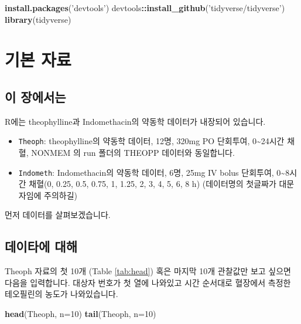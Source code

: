 \documentclass[12pt,]{krantz}
\newenvironment{Shaded}{\begin{snugshade}}{\end{snugshade}}
\newcommand{\KeywordTok}[1]{\textcolor[rgb]{0.13,0.29,0.53}{\textbf{#1}}}
\newcommand{\DataTypeTok}[1]{\textcolor[rgb]{0.13,0.29,0.53}{#1}}
\newcommand{\DecValTok}[1]{\textcolor[rgb]{0.00,0.00,0.81}{#1}}
\newcommand{\StringTok}[1]{\textcolor[rgb]{0.31,0.60,0.02}{#1}}
\newcommand{\OperatorTok}[1]{\textcolor[rgb]{0.81,0.36,0.00}{\textbf{#1}}}
\newcommand{\NormalTok}[1]{#1}
\providecommand{\tightlist}{%
  \setlength{\itemsep}{0pt}\setlength{\parskip}{0pt}}
\theoremstyle{definition}
\theoremstyle{definition}
\theoremstyle{definition}
\theoremstyle{remark}
\begin{document}
\begin{Shaded}
\begin{Highlighting}[]
\KeywordTok{install.packages}\NormalTok{(}\StringTok{'devtools'}\NormalTok{)}
\NormalTok{devtools}\OperatorTok{::}\KeywordTok{install_github}\NormalTok{(}\StringTok{'tidyverse/tidyverse'}\NormalTok{)}
\KeywordTok{library}\NormalTok{(tidyverse)}
\end{Highlighting}
\end{Shaded}

\chapter{기본 자료}\label{datasets}

\section{이 장에서는}\label{introdatasets}

R에는 theophylline과 Indomethacin의 약동학 데이터가 내장되어 있습니다.

\begin{itemize}
\tightlist
\item
  \texttt{Theoph}: theophylline의 약동학 데이터, 12명, 320mg PO
  단회투여, 0\textasciitilde{}24시간 채혈, NONMEM 의 run 폴더의 THEOPP
  데이터와 동일합니다.
\item
  \texttt{Indometh}: Indomethacin의 약동학 데이터, 6명, 25mg IV bolus
  단회투여, 0\textasciitilde{}8시간 채혈(0, 0.25, 0.5, 0.75, 1, 1.25, 2,
  3, 4, 5, 6, 8 h) (데이터명의 첫글짜가 대문자임에 주의하길)
\end{itemize}

먼저 데이터를 살펴보겠습니다.

\section{데이타에 대해}\label{TheophData}

Theoph 자료의 첫 10개 (Table \ref{tab:head}) 혹은 마지막 10개 관찰값만
보고 싶으면 다음을 입력합니다. 대상자 번호가 첫 열에 나와있고 시간
순서대로 혈장에서 측정한 테오필린의 농도가 나와있습니다.

\begin{Shaded}
\begin{Highlighting}[]
\KeywordTok{head}\NormalTok{(Theoph, }\DataTypeTok{n=}\DecValTok{10}\NormalTok{)}
\KeywordTok{tail}\NormalTok{(Theoph, }\DataTypeTok{n=}\DecValTok{10}\NormalTok{)}
\end{Highlighting}
\end{Shaded}
\end{document}
